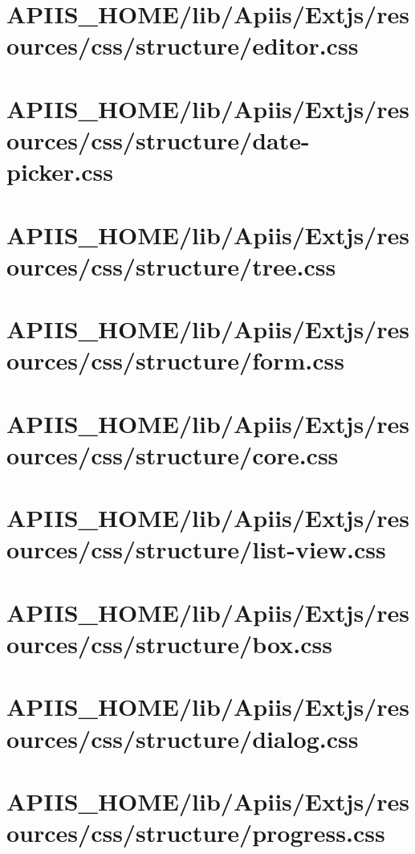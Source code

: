 \section{APIIS\_HOME/lib/Apiis/Extjs/resources/css/structure/editor.css} 
\section{APIIS\_HOME/lib/Apiis/Extjs/resources/css/structure/date-picker.css} 
\section{APIIS\_HOME/lib/Apiis/Extjs/resources/css/structure/tree.css} 
\section{APIIS\_HOME/lib/Apiis/Extjs/resources/css/structure/form.css} 
\section{APIIS\_HOME/lib/Apiis/Extjs/resources/css/structure/core.css} 
\section{APIIS\_HOME/lib/Apiis/Extjs/resources/css/structure/list-view.css} 
\section{APIIS\_HOME/lib/Apiis/Extjs/resources/css/structure/box.css} 
\section{APIIS\_HOME/lib/Apiis/Extjs/resources/css/structure/dialog.css} 
\section{APIIS\_HOME/lib/Apiis/Extjs/resources/css/structure/progress.css} 
